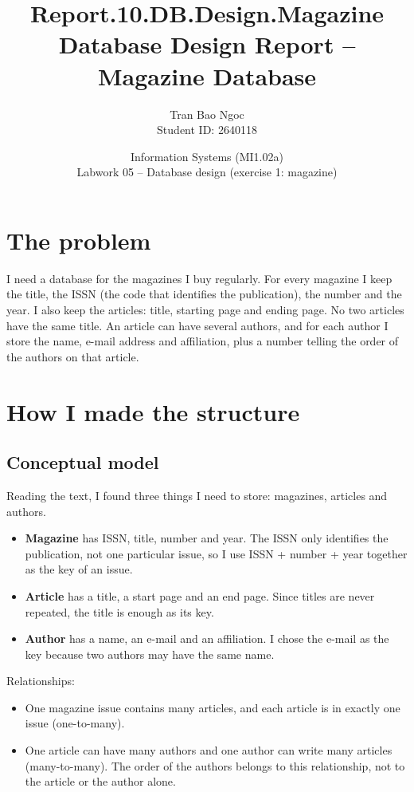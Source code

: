 \documentclass[11pt,a4paper]{article}
\title{\textbf{Report.10.DB.Design.Magazine}\\[0.3em]\large Database Design Report -- Magazine Database}
\author{Tran Bao Ngoc \\ Student ID: 2640118}
\date{Information Systems (MI1.02a) \\ Labwork 05 -- Database design (exercise 1: magazine)}
\begin{document}
\maketitle

\section{The problem}
I need a database for the magazines I buy regularly. For every magazine I keep the title, the ISSN (the code that identifies the publication), the number and the year. I also keep the articles: title, starting page and ending page. No two articles have the same title. An article can have several authors, and for each author I store the name, e-mail address and affiliation, plus a number telling the order of the authors on that article.

\section{How I made the structure}

\subsection{Conceptual model}
Reading the text, I found three things I need to store: magazines, articles and authors.
\begin{itemize}
    \item \textbf{Magazine} has ISSN, title, number and year. The ISSN only identifies the publication, not one particular issue, so I use ISSN + number + year together as the key of an issue.
    \item \textbf{Article} has a title, a start page and an end page. Since titles are never repeated, the title is enough as its key.
    \item \textbf{Author} has a name, an e-mail and an affiliation. I chose the e-mail as the key because two authors may have the same name.
\end{itemize}

Relationships:
\begin{itemize}
    \item One magazine issue contains many articles, and each article is in exactly one issue (one-to-many).
    \item One article can have many authors and one author can write many articles (many-to-many). The order of the authors belongs to this relationship, not to the article or the author alone.
\end{itemize}
\end{document}

